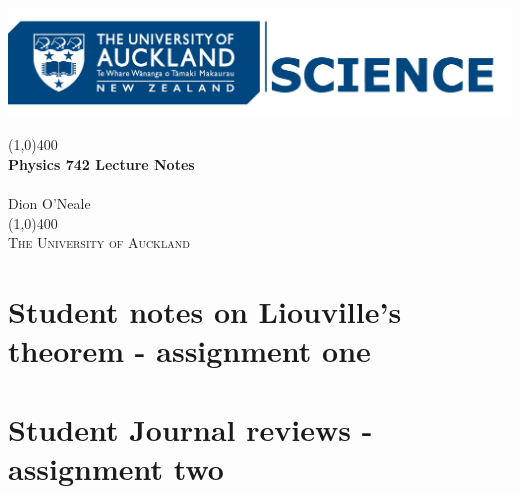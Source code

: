 \documentclass[final]{article}
\numberwithin{equation}{section}
\begin{document}
\newcommand{\calG}{\mathcal{G}}

\begin{titlepage}
    \begin{center}
        \begin{center}
            \includegraphics[width=\textwidth]{UOA_Science.png}
        \end{center}
        \vfill
        \line(1,0){400}\\[1mm]
        \huge{\textbf{Physics 742 Lecture Notes}}\\
        \Large{\color{HeadColor}{Statistical Mechanics \& Complex Networks}}\\
        Dion O'Neale\\
        \line(1,0){400}\\[3mm]
        \vfill
        \large{\textsc{The University of Auckland}}
    \end{center}
\end{titlepage}
\newpage
\tableofcontents
\newpage










\section{Student notes on Liouville's theorem - assignment one}








\section{Student Journal reviews - assignment two}







\end{document}
